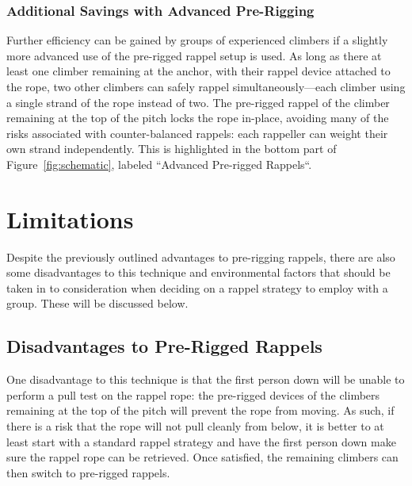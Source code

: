 \documentclass[nonacm,acmtog]{acmart}
\begin{document}

\subsubsection{Additional Savings with Advanced Pre-Rigging}
\label{sec:advanced}

  Further efficiency can be gained by groups of experienced climbers if a
  slightly more advanced use of the pre-rigged rappel setup is used.  As long
  as there at least one climber remaining at the anchor, with their rappel device
  attached to the rope, two other climbers can safely rappel
  simultaneously---each climber using a single strand of the rope instead of
  two.  The pre-rigged rappel of the climber remaining at the top of the pitch
  locks the rope in-place, avoiding many of the risks associated with
  counter-balanced rappels: each rappeller can weight their own strand
  independently.  This is highlighted in the bottom part of
  Figure~\ref{fig:schematic}, labeled ``Advanced Pre-rigged Rappels``.


\section{Limitations}
\label{sec:limitations}

  Despite the previously outlined advantages to pre-rigging rappels, there are
  also some disadvantages to this technique and environmental factors that
  should be taken in to consideration when deciding on a rappel strategy to
  employ with a group.  These will be discussed below.

\subsection{Disadvantages to Pre-Rigged Rappels}

  One disadvantage to this technique is that the first person down will be
  unable to perform a pull test on the rappel rope: the pre-rigged devices of
  the climbers remaining at the top of the pitch will prevent the rope from
  moving.  As such, if there is a risk that the rope will not pull cleanly from
  below, it is better to at least start with a standard rappel strategy and
  have the first person down make sure the rappel rope can be retrieved.  Once
  satisfied, the remaining climbers can then switch to pre-rigged rappels.
\end{document}
